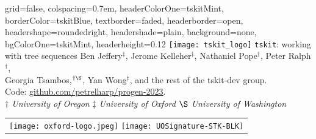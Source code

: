 \documentclass[landscape,a0paper,fontscale=0.4]{baposter}
\newcommand{\tskit}{{\texttt{tskit}}}
\begin{document}
\begin{poster}{
 grid=false,
 colspacing=0.7em,
 headerColorOne=tskitMint,
 borderColor=tskitBlue,
 textborder=faded,
 headerborder=open,
 headershape=roundedright,
 headershade=plain,
 background=none,
 bgColorOne=tskitMint,
 headerheight=0.12\textheight}
 { \texttt{[image: tskit\_logo]}
 }
 {\Huge \tskit{}: \sc working with tree sequences}
  {\sf %
    Ben Jeffery${}^\ddagger$,
    Jerome Kelleher$^{\ddagger}$,
    Nathaniel Pope${}^\dagger$,
    Peter Ralph${}^\dagger$,
    \\  \vspace{-1.0mm}
    Georgia Tsambos,${}^{\dagger\S}$,
    Yan Wong$^{\ddagger}$,
    and the rest of the tskit-dev group.
    \\  \vspace{-1.0mm}
    Code: \url{github.com/petrelharp/progen-2023}. 
    \\  \vspace{-1.0mm}
    {\small \textit{$\dagger$ University of Oregon} } %
    {\small \textit{$\ddagger$ University of Oxford} } %
    {\small \textit{$\S$ University of Washington}} \\
  }
 {
  \begin{tabular}{r}
    \texttt{[image: oxford-logo.jpeg]}
      \hspace{1em}
    \texttt{[image: UOSignature-STK-BLK]}\\
  \end{tabular}
 }



\end{poster}
\end{document}
